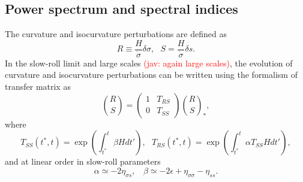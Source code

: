 \documentclass[amssymb,twocolumn,prd,nofootinbib,showpacs]{revtex4-1}
\newcommand{\jav}[1]{\textcolor{red}{(jav: #1)}}
\begin{document}
\subsection{Power spectrum and spectral indices}

The curvature and isocurvature perturbations are defined as
\begin{equation}\label{RS}
R\equiv\frac{H}{\dot\sigma}\delta \sigma, \ \ \ S=\frac{H}{\dot \sigma}\delta s.
\end{equation}
In the slow-roll limit and large scales \jav{again large scales}, the evolution of curvature and isocurvature perturbations can be written using the formalism of transfer matrix as
\begin{equation}
\binom{R }{S}=\begin{pmatrix}1 & T_{RS}\\ 0& T_{SS}\end{pmatrix}\binom{R}{S}_*,
\end{equation}
where
\begin{subequations}
\begin{equation}
T_{SS}(t^*,t)=\exp\left(\int^t_{t^*}\beta Hdt'\right), \ \ \
\end{equation}
\begin{equation}\label{TRS}
T_{RS}(t^*,t)=\exp\left(\int^t_{t^*}\alpha T_{SS}Hdt'\right),
\end{equation}
\end{subequations}
and at linear order in slow-roll parameters
\begin{equation}
\alpha\simeq -2\eta_{\sigma s}, \ \ \ \ \beta\simeq-2\epsilon+\eta_{\sigma\sigma}-\eta_{ss}.
\end{equation}
\end{document}
